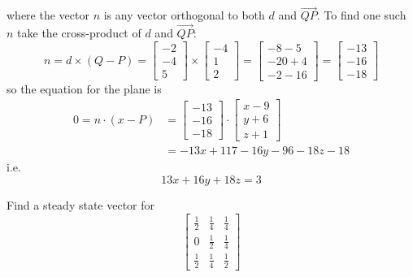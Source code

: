 \documentclass{article}
\begin{document}
\begin{Answer}
  where the vector $n$ is any vector orthogonal to both $d$ and $\vec{QP}$.
  To find one such $n$ take the cross-product of $d$ and $\vec{QP}$:
  \begin{equation*}
  n = d\times (Q-P) = \left[
  \begin{array}{c}
  -2\\
  -4\\
  5
  \end{array}
  \right] \times \left[
  \begin{array}{c}
  -4\\
  1\\
  2
  \end{array}
  \right] = \left[
  \begin{array}{c}
  -8-5\\
  -20+4\\
  -2-16
  \end{array}
  \right] = \left[
  \begin{array}{c}
  -13\\
  -16\\
  -18
  \end{array}
  \right]
  \end{equation*}
  so the equation for the plane is
  \begin{align*}
    0 = n\cdot (x-P) &= \left[
    \begin{array}{c}
    -13\\
    -16\\
    -18
    \end{array}
    \right]\cdot \left[
    \begin{array}{c}
    x-9\\
    y+6\\
    z+1
    \end{array}
    \right] \\
    &= -13x+117-16y-96-18z-18
  \end{align*}
  i.e. 
  \begin{equation*}
  13x+16y+18z = 3
  \end{equation*}
\end{Answer}

\begin{Exercise}
  Find a steady state vector for
  \begin{equation*}
  \left[
  \begin{array}{ccc}
  \frac{1}{2} & \frac{1}{4} & \frac{1}{4}\\
  0 & \frac{1}{2} & \frac{1}{4}\\
  \frac{1}{2} & \frac{1}{4} & \frac{1}{2}
  \end{array}
  \right]
  \end{equation*}
\end{Exercise}
\end{document}
